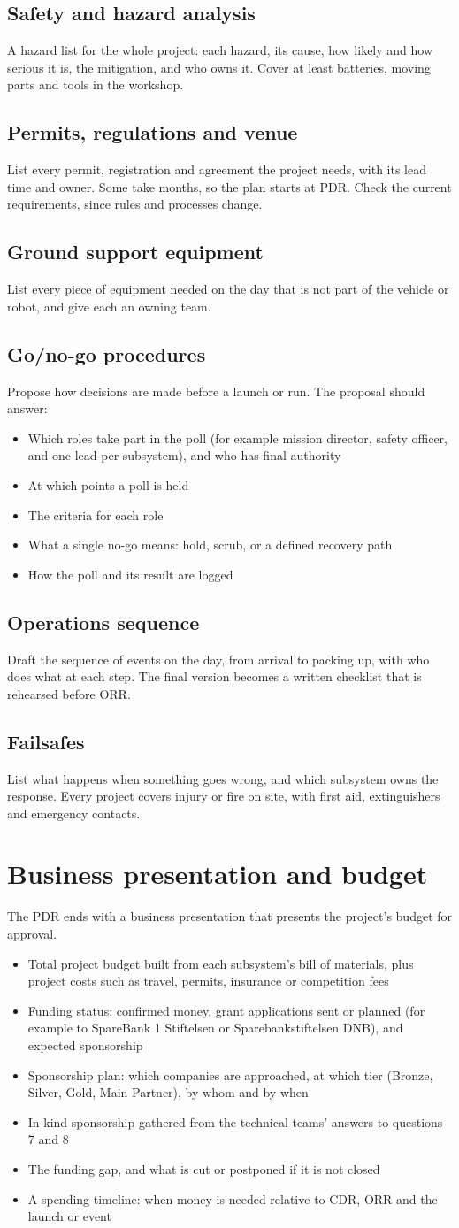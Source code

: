 \documentclass{../../Common/Latex/Templates/rapport}
\renewcommand{\vsection}[1]{\section{#1}}
\renewcommand{\vsubsection}[1]{\subsection{#1}}
\begin{document}
\vsubsection{Safety and hazard analysis}
A hazard list for the whole project: each hazard, its cause, how likely and how serious it is, the mitigation, and who owns it. Cover at least batteries, moving parts and tools in the workshop.

\vsubsection{Permits, regulations and venue}
List every permit, registration and agreement the project needs, with its lead time and owner. Some take months, so the plan starts at PDR. Check the current requirements, since rules and processes change.

\vsubsection{Ground support equipment}
List every piece of equipment needed on the day that is not part of the vehicle or robot, and give each an owning team.

\vsubsection{Go/no-go procedures}
Propose how decisions are made before a launch or run. The proposal should answer:
\begin{itemize}
  \item Which roles take part in the poll (for example mission director, safety officer, and one lead per subsystem), and who has final authority
  \item At which points a poll is held
  \item The criteria for each role
  \item What a single no-go means: hold, scrub, or a defined recovery path
  \item How the poll and its result are logged
\end{itemize}

\vsubsection{Operations sequence}
Draft the sequence of events on the day, from arrival to packing up, with who does what at each step. The final version becomes a written checklist that is rehearsed before ORR.

\vsubsection{Failsafes}
List what happens when something goes wrong, and which subsystem owns the response. Every project covers injury or fire on site, with first aid, extinguishers and emergency contacts.

\vsection{Business presentation and budget}
The PDR ends with a business presentation that presents the project's budget for approval.
\begin{itemize}
  \item Total project budget built from each subsystem's bill of materials, plus project costs such as travel, permits, insurance or competition fees
  \item Funding status: confirmed money, grant applications sent or planned (for example to SpareBank 1 Stiftelsen or Sparebankstiftelsen DNB), and expected sponsorship
  \item Sponsorship plan: which companies are approached, at which tier (Bronze, Silver, Gold, Main Partner), by whom and by when
  \item In-kind sponsorship gathered from the technical teams' answers to questions 7 and 8
  \item The funding gap, and what is cut or postponed if it is not closed
  \item A spending timeline: when money is needed relative to CDR, ORR and the launch or event
\end{itemize}
\end{document}
